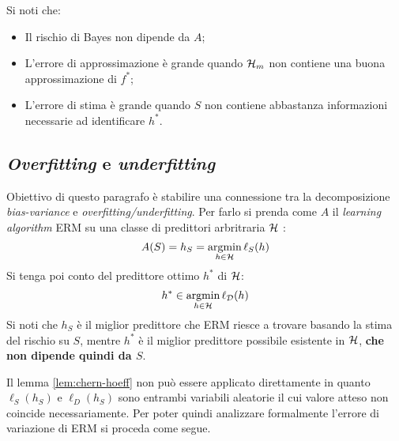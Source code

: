 Si noti che:
\begin{itemize}
    \item Il rischio di Bayes non dipende da $A$;
    \item L'errore di approssimazione è grande quando $\mathcal{H}_m$ non contiene una buona
        approssimazione di $f^*$;
    \item L'errore di stima è grande quando $S$ non contiene abbastanza informazioni
        necessarie ad identificare $h^*$.
\end{itemize}

\subsection{\textit{Overfitting} e \textit{underfitting}}
Obiettivo di questo paragrafo è stabilire una connessione tra la decomposizione
\textit{bias-variance} e \textit{overfitting/underfitting}. Per farlo si prenda come
$A$ il \textit{learning algorithm} ERM su una classe di predittori arbritraria 
$\mathcal{H}$  :
$$ A(S) = h_S = \operatorname*{argmin}_{h \in \mathcal{H}}\ell_S(h) $$
Si tenga poi conto del predittore ottimo $h^*$ di $\mathcal{H}$:
$$ h^* \in \operatorname*{argmin}_{h\in\mathcal{H}} \ell_{\mathcal{D}}(h) $$
Si noti che $h_S$ è il miglior predittore che ERM riesce a trovare basando la stima
del rischio su $S$, mentre $h^*$ è il miglior predittore possibile esistente in
$\mathcal{H}$, \textbf{che non dipende quindi da $S$}.

Il lemma \ref{lem:chern-hoeff} non può essere applicato direttamente in quanto 
$\ell_S(h_S)$ e $\ell_D(h_S)$ sono entrambi variabili aleatorie il cui valore atteso
non coincide necessariamente. Per poter quindi analizzare formalmente l'errore
di variazione di ERM si proceda come segue.


